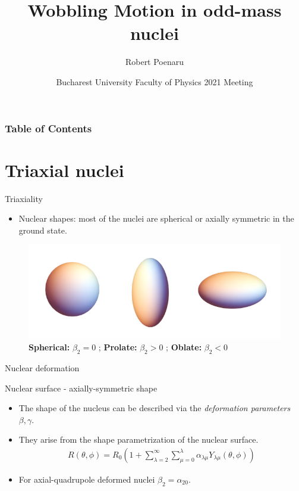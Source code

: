 \documentclass{beamer}
\title[Wobbling Motion in Odd-Mass Nuclei] %
{Wobbling Motion in odd-mass nuclei}
\author[R. Poenaru] %
{Robert Poenaru\inst{1,2}}
\institute[DFT @ IFIN-HH] %
{
  \inst{1}%
  Department of Theoretical Physics\newline
  IFIN-HH
  \and
  \inst{2}%
  Faculty of Physics\newline
  University of Bucharest
}
\date[\today] %
{Bucharest University Faculty of Physics 2021 Meeting}
\begin{document}
\maketitle
\begin{frame}
\frametitle{Table of Contents}
\tableofcontents
\end{frame}

\section{Triaxial nuclei}

\begin{frame}{Triaxiality}
\begin{itemize}
    \item Nuclear shapes: most of the nuclei are spherical or axially symmetric in the ground state.
\end{itemize}
  \begin{figure}
    \centering
    \includegraphics[scale=0.4]{figs/nuclear_shapes.png}
    \caption{\textbf{Spherical:} $\beta_2=0$ ; \textbf{Prolate:} $\beta_2>0$ ; \textbf{Oblate:} $\beta_2<0$}
  \end{figure}
\end{frame}

\begin{frame}{Nuclear deformation}
    \begin{block}{Nuclear surface - axially-symmetric shape}
    \begin{itemize}
    \item The shape of the nucleus can be described via the \textit{deformation parameters} $\beta,\gamma$. 
    \item They arise from the shape parametrization of the nuclear surface.
    \begin{align}
        R(\theta,\phi)=R_0\left(1+\sum_{\lambda=2}^{\infty}\sum_{\mu=0}^{\lambda}\alpha_{\lambda\mu}Y_{\lambda\mu}(\theta,\phi)\right)
    \end{align}
    \item For axial-quadrupole deformed nuclei $\beta_2=\alpha_{20}$.
    \end{itemize}
    \end{block}
\end{frame}
\end{document}
